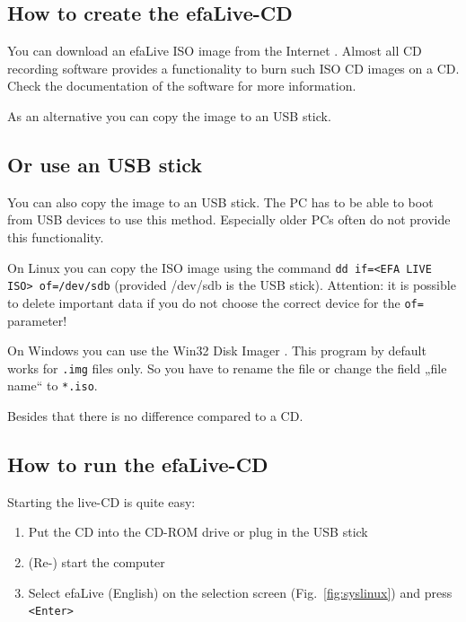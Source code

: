 \documentclass[a4paper,12pt,twoside]{article}
\begin{document}
\subsection{How to create the efaLive-CD}
\label{sct:create_cd}
You can download an efaLive ISO image from the Internet \cite{EFA4}.
Almost all CD recording software provides a functionality to burn such
ISO CD images on a CD. Check the documentation of the software for more
information.

As an alternative you can copy the image to an USB stick.

\subsection{Or use an USB stick}
\label{sct:usb_stick}
You can also copy the image to an USB stick. The
PC has to be able to boot from USB devices to use this method.
Especially older PCs often do not provide this functionality.

On Linux you can copy the ISO image using the command \texttt{dd
if={\textless}EFA LIVE ISO{\textgreater} of=/dev/sdb}
(provided /dev/sdb is the USB stick). Attention: it is possible to
delete important data if you do not choose the correct device for the
\texttt{of=} parameter!

On Windows you can use the Win32 Disk Imager \cite{IMG1}. This program by
default works for \texttt{.img} files only. So you
have to rename the file or change the field „file name“ to
\texttt{*.iso}.

Besides that there is no difference compared to a CD.


\subsection{How to run the efaLive-CD}
\label{sct:live_run}
Starting the live-CD is quite easy:

\begin{enumerate}
    \item Put the CD into the CD-ROM drive or plug in the USB stick
    \item (Re-) start the computer
    \item Select efaLive (English) on the selection screen
        (Fig.~\ref{fig:syslinux}) and press \texttt{{\textless}Enter{\textgreater}}
\end{enumerate}
\end{document}
